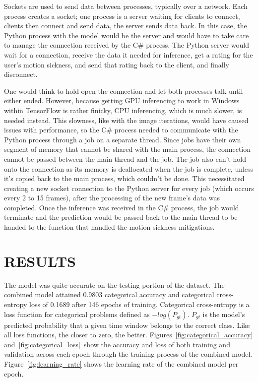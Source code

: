 Sockets are used to send data between processes, typically over a network.
Each process creates a socket; one process is a server waiting for clients to connect, clients then connect and send data, the server sends data back.
In this case, the Python process with the model would be the server and would have to take care to manage the connection received by the C\# process.
The Python server would wait for a connection, receive the data it needed for inference, get a rating for the user's motion sickness, and send that rating back to the client, and finally disconnect.

One would think to hold open the connection and let both processes talk until either ended.
However, because getting GPU inferencing to work in Windows within TensorFlow is rather finicky, CPU inferencing, which is much slower, is needed instead.
This slowness, like with the image iterations, would have caused issues with performance, so the C\# process needed to communicate with the Python process through a job on a separate thread.
Since jobs have their own segment of memory that cannot be shared with the main process, the connection cannot be passed between the main thread and the job.
The job also can't hold onto the connection as its memory is deallocated when the job is complete, unless it's copied back to the main process, which couldn't be done.
This necessitated creating a new socket connection to the Python server for every job (which occurs every 2 to 15 frames), after the processing of the new frame's data was completed.
Once the inference was received in the C\# process, the job would terminate and the prediction would be passed back to the main thread to be handed to the function that handled the motion sickness mitigations.

\chapter{RESULTS}
\label{ch:results}

The model was quite accurate on the testing portion of the dataset.
The combined model attained 0.9803 categorical accuracy and categorical cross-entropy loss of 0.1689 after 146 epochs of training.
Categorical cross-entropy is a loss function for categorical problems defined as $-log(P_{gt})$.
$P_{gt}$ is the model's predicted probability that a given time window belongs to the correct class.
Like all loss functions, the closer to zero, the better.
Figures~\ref{fig:categorical_accuracy} and~\ref{fig:categorical_loss}~show the accuracy and loss of both training and validation across each epoch through the training process of the combined model.
Figure~\ref{fig:learning_rate} shows the learning rate of the combined model per epoch.

